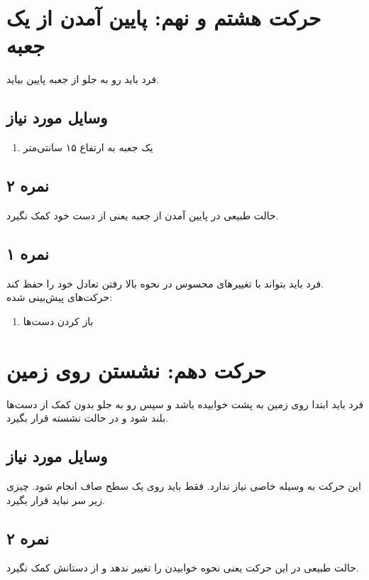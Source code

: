 \documentclass[12pt]{report}
\begin{document}
	\section*{حرکت هشتم و نهم: پایین آمدن از یک جعبه}
	فرد باید رو به جلو از جعبه پایین بیاید.
	\subsection*{وسایل مورد نیاز}
	\begin{enumerate}
		\item یک جعبه به ارتفاع ۱۵ سانتی‌متر
	\end{enumerate}
	\subsection*{نمره ۲}
	حالت طبیعی در پایین آمدن از جعبه یعنی از دست خود کمک نگیرد.
	\subsection*{نمره ۱}
	فرد باید بتواند با تغییر‌های محسوس در نحوه بالا رفتن تعادل خود را حفظ کند.\\
	حرکت‌های پیش‌بینی شده:
	\begin{enumerate}
		\item باز کردن دست‌ها
	\end{enumerate}
	\newpage
	
	\section*{حرکت دهم: نشستن روی زمین}
	فرد باید ابتدا روی زمین به پشت خوابیده باشد و سپس رو به جلو بدون کمک از دست‌ها بلند شود و در حالت نشسته قرار بگیرد.
	\subsection*{وسایل مورد نیاز}
	این حرکت به وسیله خاصی نیاز ندارد. فقط باید روی یک سطح صاف انجام شود. چیزی زیر سر نباید قرار بگیرد.
	\subsection*{نمره ۲}
	حالت طبیعی در این حرکت یعنی نحوه خوابیدن را تغییر ندهد و از دستانش کمک نگیرد.
\end{document}
